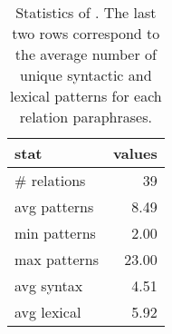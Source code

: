 \begin{table}[t]
    \centering
\begin{tabular}{lr}
\toprule
         stat &  values \\
\midrule
    \# relations &   39 \\
 avg patterns &    8.49 \\
 min patterns &    2.00 \\
 max patterns &   23.00 \\
   avg syntax &    4.51 \\
  avg lexical &    5.92 \\
\bottomrule
\end{tabular}
    \caption{Statistics of \resource{}. The last two rows correspond to the average number of unique syntactic and lexical patterns for each relation paraphrases.}
    \label{tab:rel-graph-stats}
\end{table}